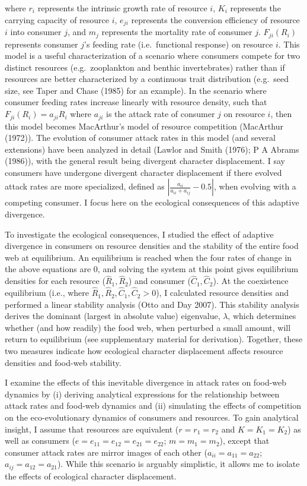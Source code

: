 \documentclass[11pt,]{article}
\begin{document}
where \(r_i\) represents the intrinsic growth rate of resource \(i\),
\(K_i\) represents the carrying capacity of resource \(i\), \(e_{ji}\)
represents the conversion efficiency of resource \(i\) into consumer
\(j\), and \(m_j\) represents the mortality rate of consumer \(j\).
\(F_{ji}(R_i)\) represents consumer \(j\)'s feeding rate
(i.e.~functional response) on resource \(i\). This model is a useful
characterization of a scenario where consumers compete for two distinct
resources (e.g.~zooplankton and benthic invertebrates) rather than if
resources are better characterized by a continuous trait distribution
(e.g.~seed size, see Taper and Chase (1985) for an example). In the
scenario where consumer feeding rates increase linearly with resource
density, such that \(F_{ji}(R_i)=a_{ji}R_i\) where \(a_{ji}\) is the
attack rate of consumer \(j\) on resource \(i\), then this model becomes
MacArthur's model of resource competition (MacArthur (1972)). The
evolution of consumer attack rates in this model (and several
extensions) have been analyzed in detail (Lawlor and Smith (1976); P A
Abrams (1986)), with the general result being divergent character
displacement. I say consumers have undergone divergent character
displacement if there evolved attack rates are more specialized, defined
as \(|\frac{a_{ii}}{a_{ii}+a_{ij}}-0.5|\), when evolving with a
competing consumer. I focus here on the ecological consequences of this
adaptive divergence.

To investigate the ecological consequences, I studied the effect of
adaptive divergence in consumers on resource densities and the stability
of the entire food web at equilibrium. An equilibrium is reached when
the four rates of change in the above equations are 0, and solving the
system at this point gives equilibrium densities for each resource
(\(\hat R_1,\hat R_2\)) and consumer (\(\hat C_1,\hat C_2\)). At the
coexistence equilibrium (i.e., where
\(\hat R_1,\hat R_2, \hat C_1,\hat C_2 > 0\)), I calculated resource
densities and performed a linear stability analysis (Otto and Day 2007).
This stability analysis derives the dominant (largest in absolute value)
eigenvalue, \(\lambda\), which determines whether (and how readily) the
food web, when perturbed a small amount, will return to equilibrium (see
supplementary material for derivation). Together, these two measures
indicate how ecological character displacement affects resource
densities and food-web stability.

I examine the effects of this inevitable divergence in attack rates on
food-web dynamics by (i) deriving analytical expressions for the
relationship between attack rates and food-web dynamics and (ii)
simulating the effects of competition on the eco-evolutionary dynamics
of consumers and resources. To gain analytical insight, I assume that
resources are equivalent (\(r=r_1=r_2\) and \(K=K_1=K_2\)) as well as
consumers (\(e=e_{11}=e_{12}=e_{21}=e_{22}\); \(m=m_1=m_2\)), except
that consumer attack rates are mirror images of each other
(\(a_{ii}=a_{11}=a_{22}\); \(a_{ij}=a_{12}=a_{21}\)). While this
scenario is arguably simplistic, it allows me to isolate the effects of
ecological character displacement.
\end{document}
